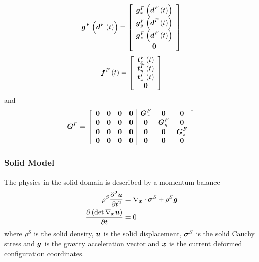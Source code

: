 \begin{equation}
   \boldsymbol{g}^{F}\left(  \boldsymbol{d}^{F}\left( t \right)  \right) =\left[\begin{array}{c}
   \boldsymbol{g}^{F}_{x}\left(  \boldsymbol{d}^{F}\left( t \right)  \right)  \\
   \boldsymbol{g}^{F}_{y}\left(  \boldsymbol{d}^{F}\left( t \right)  \right)  \\
   \boldsymbol{g}^{F}_{z}\left(  \boldsymbol{d}^{F}\left( t \right)  \right)  \\
  \boldsymbol{0}
  \end{array}\right]
\end{equation}
\begin{equation}
   \boldsymbol{f}^{F}\left( t \right) =\left[\begin{array}{c}
   \boldsymbol{t}^{F}_{x}\left( t \right)  \\
   \boldsymbol{t}^{F}_{y}\left( t \right)  \\
   \boldsymbol{t}^{F}_{z}\left( t \right)  \\
  \boldsymbol{0}
  \end{array}\right]
\end{equation}
and
\begin{equation}
  \matr{G}^{F}=\left[\begin{array}{cccc|ccc}
    \matr{0} & \matr{0} & \matr{0} & \matr{0} & \matr{G}^{F}_{x} & \matr{0} & \matr{0} \\
    \matr{0} & \matr{0} & \matr{0} & \matr{0} & \matr{0} & \matr{G}^{F}_{y} & \matr{0} \\
    \matr{0} & \matr{0} & \matr{0} & \matr{0} & \matr{0} & \matr{0} & \matr{G}^{F}_{z} \\
    \matr{0} & \matr{0} & \matr{0} & \matr{0} & \matr{0} & \matr{0} & \matr{0}
  \end{array}\right]
\end{equation}


\subsubsection{Solid Model}

The physics in the solid domain is described by a momentum balance
\begin{align}
  \rho^{S}\deltwosqby{\vectr{u}}{t}&=\divergence{\vectr{x}}{\tensor{\sigma}^{S}}+\rho^{S}\vectr{g}
  \label{eqn:FSIElasticMomentum} \\
  \delby{\pbrac{\determinant{\gradient{\vectr{x}}{\vectr{u}}}}}{t}&=0 \label{eqn:FSIElasticContinuity}
\end{align}
where $\rho^{S}$ is the solid density, $\boldsymbol{u}$ is the solid displacement,
$\boldsymbol{\mathit{\sigma}}^{S}$ is the solid Cauchy stress and $\boldsymbol{g}$ is the gravity
acceleration vector and $\boldsymbol{x}$ is the current deformed configuration coordinates.

